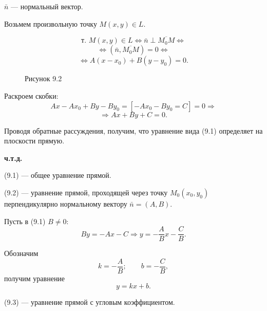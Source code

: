 \documentclass[12pt,a4paper]{article}
\newcommand{\vn}{\bar n}
\begin{document}
$\vn$ --- нормальный вектор.

Возьмем произвольную точку $M(x,y)\in L$.

\begin{figure}[H]
  \centering
  \begin{minipage}{0.4\textwidth}
    \centering
    \caption*{Рисунок 9.2}
  \end{minipage}%
  \begin{minipage}{0.55\textwidth}
    $$
    \text{т. }M(x,y)\in L
    \Leftrightarrow \vn\perp \overline{M_0M}
    \Leftrightarrow
    $$
    $$
    \Leftrightarrow (\vn,\overline{M_0M})=0
    \Leftrightarrow
    $$
    \begin{equation}
      \Leftrightarrow A(x-x_0)+B(y-y_0)=0. \tag{9.2}
    \end{equation}
  \end{minipage}
\end{figure}

Раскроем скобки:
$$
Ax-Ax_0+By-By_0=[-Ax_0-By_0=C]=0
\Rightarrow
$$
$$
\Rightarrow Ax+By+C=0.
$$

Проводя обратные рассуждения, получим, что уравнение вида (9.1)
определяет на плоскости прямую.

\textbf{ч.т.д.}

(9.1) --- общее уравнение прямой.

(9.2) --- уравнение прямой, проходящей через точку $M_0(x_0,y_0)$
перпендикулярно нормальному вектору $\vn=(A,B)$.

Пусть в (9.1) $B\ne 0$:
$$
By=-Ax-C \Rightarrow y=-\frac ABx-\frac CB.
$$

Обозначим
$$
k=-\frac AB;\qquad b=-\frac CB,
$$
получим уравнение
\begin{equation}
  y=kx+b. \tag{9.3}
\end{equation}

(9.3) --- уравнение прямой с угловым коэффициентом.
\end{document}

